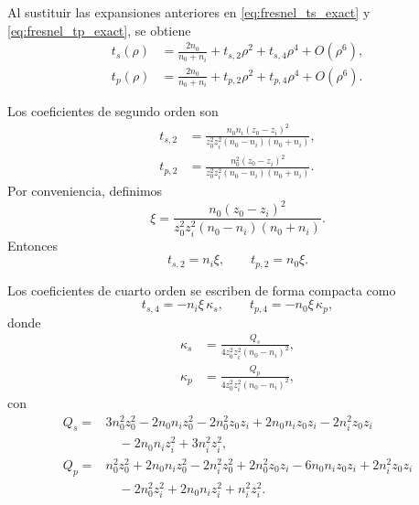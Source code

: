 Al sustituir las expansiones anteriores en \eqref{eq:fresnel_ts_exact} y \eqref{eq:fresnel_tp_exact}, se obtiene
\begin{align}
t_s(\rho)
&=
\frac{2n_0}{n_0+n_i}
+
t_{s,2}\rho^2
+
t_{s,4}\rho^4
+
O(\rho^6),
\label{eq:fresnel_ts_series_general}
\\[6pt]
t_p(\rho)
&=
\frac{2n_0}{n_0+n_i}
+
t_{p,2}\rho^2
+
t_{p,4}\rho^4
+
O(\rho^6).
\label{eq:fresnel_tp_series_general}
\end{align}

Los coeficientes de segundo orden son
\begin{align}
t_{s,2}
&=
\frac{
n_0n_i(z_0-z_i)^2
}{
z_0^2z_i^2(n_0-n_i)(n_0+n_i)
},
\label{eq:ts2_coefficient}
\\[6pt]
t_{p,2}
&=
\frac{
n_0^2(z_0-z_i)^2
}{
z_0^2z_i^2(n_0-n_i)(n_0+n_i)
}.
\label{eq:tp2_coefficient}
\end{align}
Por conveniencia, definimos
\begin{equation}
\xi
=
\frac{
n_0(z_0-z_i)^2
}{
z_0^2z_i^2(n_0-n_i)(n_0+n_i)
}.
\label{eq:xi_definition_fresnel_series}
\end{equation}
Entonces
\begin{equation}
t_{s,2}=n_i\xi,
\qquad
t_{p,2}=n_0\xi.
\label{eq:ts2_tp2_xi_form}
\end{equation}

Los coeficientes de cuarto orden se escriben de forma compacta como
\begin{equation}
t_{s,4}
=
-n_i\xi\,\kappa_s,
\qquad
t_{p,4}
=
-n_0\xi\,\kappa_p,
\label{eq:ts4_tp4_kappa_form}
\end{equation}
donde
\begin{align}
\kappa_s
&=
\frac{
Q_s
}{
4z_0^2z_i^2(n_0-n_i)^2
},
\label{eq:kappa_s_definition}
\\[8pt]
\kappa_p
&=
\frac{
Q_p
}{
4z_0^2z_i^2(n_0-n_i)^2
},
\label{eq:kappa_p_definition}
\end{align}
con
\begin{align}
Q_s
={}&
3n_0^2z_0^2
-
2n_0n_iz_0^2
-
2n_0^2z_0z_i
+
2n_0n_iz_0z_i
-
2n_i^2z_0z_i
\nonumber
\\
&\quad
-
2n_0n_iz_i^2
+
3n_i^2z_i^2,
\label{eq:Qs_definition}
\\[8pt]
Q_p
={}&
n_0^2z_0^2
+
2n_0n_iz_0^2
-
2n_i^2z_0^2
+
2n_0^2z_0z_i
-
6n_0n_iz_0z_i
+
2n_i^2z_0z_i
\nonumber
\\
&\quad
-
2n_0^2z_i^2
+
2n_0n_iz_i^2
+
n_i^2z_i^2.
\label{eq:Qp_definition}
\end{align}

